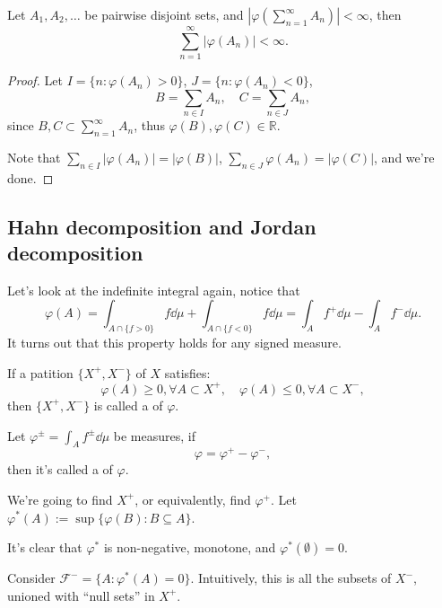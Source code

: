 \begin{proposition}
	Let $A_1, A_2,\dots$ be pairwise disjoint sets,
	and $|\varphi(\sum_{n=1}^\infty A_n)| < \infty$, then
	\[
	\sum_{n=1}^{\infty} |\varphi(A_n)| < \infty.
	\]
\end{proposition}
\begin{proof}[Proof]
    Let $I = \{n: \varphi(A_n) > 0\}$, $J = \{n: \varphi(A_n) < 0\}$,
	\[
	B = \sum_{n\in I}A_n,\quad C = \sum_{n\in J} A_n,
	\]
	since $B,C \subset \sum_{n=1}^\infty A_n$,
	thus $\varphi(B), \varphi(C) \in \mathbb{R}$.

	Note that $\sum_{n\in I} |\varphi(A_n)| = |\varphi(B)|$,
	$\sum_{n\in J}\varphi(A_n) = |\varphi(C)|$, and we're done.
\end{proof}

\subsection{Hahn decomposition and Jordan decomposition}
\label{sub:Hahn decomposition and Jordan decomposition}
Let's look at the indefinite integral again, notice that
\[
\varphi(A) = \int_{A\cap \{f>0\}} f\dd\mu + \int_{A\cap \{f<0\}}f\dd\mu
= \int_A f^+ \dd\mu - \int_A f^-\dd \mu.
\]
It turns out that this property holds for any signed measure.

\begin{definition}
	If a patition $\{X^+, X^-\}$ of $X$ satisfies:
	\[
	\varphi(A) \ge 0, \forall A \subset X^+, \quad
	\varphi(A) \le 0, \forall A \subset X^-,
	\]
	then $\{X^+, X^-\}$ is called a  of $\varphi$.
\end{definition}

\begin{definition}
	Let $\varphi^{\pm} = \int_A f^{\pm} \dd\mu$ be measures, if
	\[
	\varphi = \varphi^+ - \varphi^-,
	\]
	then it's called a  of $\varphi$.
\end{definition}

We're going to find $X^+$, or equivalently, find $\varphi^+$.
Let $\varphi^*(A) := \sup\{\varphi(B): B \subseteq A\}$.

It's clear that $\varphi^*$ is non-negative, monotone, and $\varphi^*(\emptyset) = 0$.

Consider $\mathscr{F}^- = \{A: \varphi^*(A) = 0\}$. Intuitively, this
is all the subsets of $X^-$, unioned with ``null sets'' in $X^+$.

